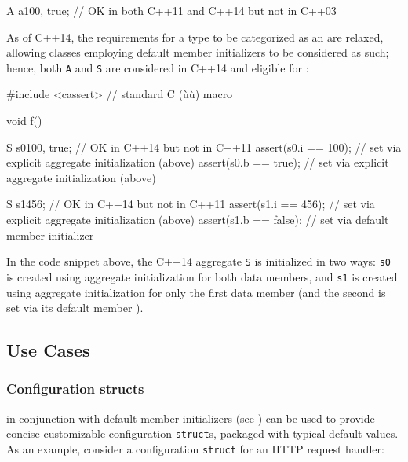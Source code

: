 \begin{emcppslisting}[emcppsbatch=e2]
A a{100, true};  // OK in both C++11 and C++14 but not in C++03
\end{emcppslisting}

\enlargethispage*{2ex}
\noindent As of C++14, the requirements for a type to be categorized as an
 are relaxed, allowing classes employing default
member initializers to be considered as such; hence, both \lstinline!A! and
\lstinline!S! are considered  in C++14 and eligible for
:

\begin{emcppshiddenlisting}[emcppsbatch=e3]
#include <cassert>  // standard C (ù{}ù) macro
\end{emcppshiddenlisting}
\begin{emcppslisting}[emcppsbatch=e3,emcppsstandards={c++14}]
void f()
{
    S s0{100, true};        // OK in C++14 but not in C++11
    assert(s0.i == 100);    // set via explicit aggregate initialization (above)
    assert(s0.b == true);   // set via explicit aggregate initialization (above)

    S s1{456};              // OK in C++14 but not in C++11
    assert(s1.i == 456);    // set via explicit aggregate initialization (above)
    assert(s1.b == false);  // set via default member initializer
}
\end{emcppslisting}

\noindent In the code snippet above, the C++14 aggregate \lstinline!S! is initialized
in two ways: \lstinline!s0! is created using aggregate initialization for
both data members, and \lstinline!s1! is created using aggregate
initialization for only the first data member (and the second is set via its
default member ).

\subsection[Use Cases]{Use Cases}\label{use-cases}

\subsubsection[Configuration \lstinline!struct!s]{Configuration {\SubsubsecCode struct}s}\label{configuration-structs}

 in conjunction with default member initializers (see ) can be used to provide concise customizable
configuration \lstinline!struct!s, packaged with typical default values. As
an example, consider a configuration \lstinline!struct! for an HTTP request
handler:

